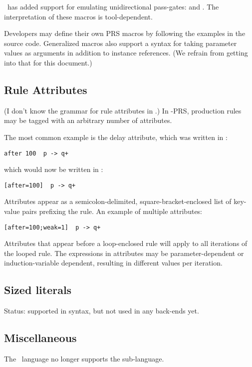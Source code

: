 \hac\ has added support for emulating unidirectional pass-gates:
 and .
The interpretation of these macros is tool-dependent.  

Developers may define their own PRS macros by following the examples
in the source code.  
Generalized macros also support a syntax for taking parameter values
as arguments in addition to instance references.  
(We refrain from getting into that for this document.)

\subsection{Rule Attributes}
\label{sec:prs:ruleattrib}

(I don't know the grammar for rule attributes in \CAST.)
In \hac-PRS, production rules may be tagged with an
arbitrary number of attributes.  

The most common example is the  delay attribute, which
was written in \CAST:

\begin{verbatim}
after 100  p -> q+
\end{verbatim}

which would now be written in \hac:

\begin{verbatim}
[after=100]  p -> q+
\end{verbatim}

Attributes appear as a semicolon-delimited, square-bracket-enclosed list 
of key-value pairs prefixing the rule.  
An example of multiple attributes:

\begin{verbatim}
[after=100;weak=1]  p -> q+
\end{verbatim}

Attributes that appear before a loop-enclosed rule will apply to
all iterations of the looped rule.  
The expressions in attributes may be parameter-dependent or 
induction-variable dependent, resulting in different values per iteration.  

\subsection{Sized literals}
\label{sec:prs:size}

Status: supported in syntax, but not used in any back-ends yet.  

\subsection{Miscellaneous}
\label{sec:prs:misc}

The \hac\ language no longer supports the  sub-language.  

